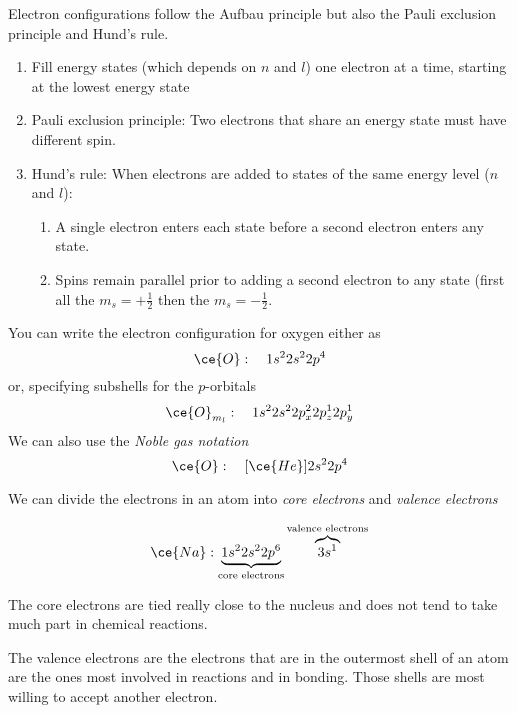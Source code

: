 \documentclass[../mit-general-chemistry.tex]{subfiles}
\begin{document}
Electron configurations follow the Aufbau principle but also the Pauli
exclusion principle and Hund's rule.


\begin{enumerate}
\item Fill energy states (which depends on $n$ and $l$) one electron
  at a time, starting at the lowest energy state
\item Pauli exclusion principle: Two electrons that share an energy
  state must have different spin.
\item Hund's rule: When electrons are added to states of the same
  energy level ($n$ and $l$):
  \begin{enumerate}
  \item A single electron enters each state before a second electron
    enters any state.
  \item Spins remain parallel prior to adding a second electron to any
    state (first all the $m_s = +\frac{1}{2}$ then the $m_s =
    -\frac{1}{2}$.
  \end{enumerate}
\end{enumerate}


\begin{remark}
  You can write the electron configuration for oxygen either as
  \begin{equation*}
    \ce{O}:\quad 1s^22s^22p^4
  \end{equation*}
  or, specifying subshells for the $p$-orbitals
  \begin{equation*}
    \ce{O}_{m_l}:\quad 1s^22s^22p_x^22p_z^12p_y^1
  \end{equation*}
  We can also use the {\em Noble gas notation}
  \begin{equation*}
    \ce{O}:\quad [\ce{He}]2s^22p^4
  \end{equation*}
\end{remark}


We can divide the electrons in an atom into {\em core electrons} and
{\em valence electrons}

\begin{equation*}
  \ce{Na} : \underbrace{1s^22s^22p^6}_{\text{core electrons}}\overbrace{3s^1}^{\text{valence electrons}}
\end{equation*}

The core electrons are tied really close to the nucleus and does not
tend to take much part in chemical reactions.

The valence electrons are the electrons that are in the outermost
shell of an atom are the ones most involved in reactions and in
bonding. Those shells are most willing to accept another electron.
\end{document}
